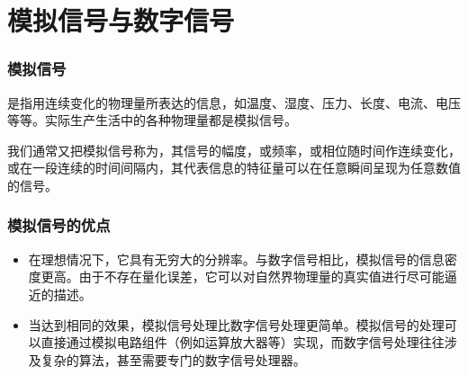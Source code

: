 \section{模拟信号与数字信号}

\begin{frame}
    \frametitle{模拟信号}
        \begin{minipage}{0.48\linewidth}
            是指用连续变化的物理量所表达的信息，如温度、湿度、压力、长度、电流、电压等等。实际生产生活中的各种物理量都是模拟信号。

    我们通常又把模拟信号称为，其信号的幅度，或频率，或相位随时间作连续变化，或在一段连续的时间间隔内，其代表信息的特征量可以在任意瞬间呈现为任意数值的信号。

        \end{minipage}\hfill        
        \begin{minipage}{0.48\linewidth}
            \begin{center}
            \end{center}
        \end{minipage}
    

\end{frame}

\begin{frame}
    \frametitle{模拟信号的优点}
    \begin{itemize}
      \item {}
      
      在理想情况下，它具有无穷大的分辨率。与数字信号相比，模拟信号的信息密度更高。由于不存在量化误差，它可以对自然界物理量的真实值进行尽可能逼近的描述。

      \item {}
      
      当达到相同的效果，模拟信号处理比数字信号处理更简单。模拟信号的处理可以直接通过模拟电路组件（例如运算放大器等）实现，而数字信号处理往往涉及复杂的算法，甚至需要专门的数字信号处理器。
    \end{itemize}
\end{frame}

